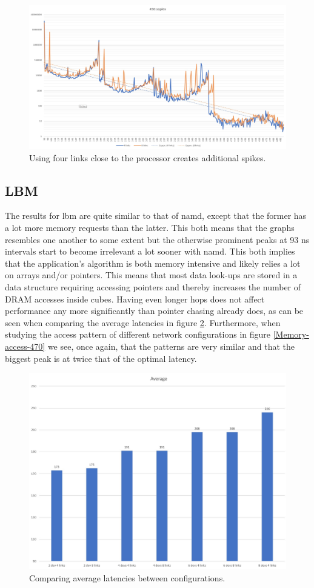 \begin{figure}[!ht]
    \centering
    \includegraphics[width=0.75\linewidth]{figure/450-2_4-8.jpg}
    \caption{Using four links close to the processor creates additional spikes.}
    \label{Memory-access-450-2-dev-4-8-links}
\end{figure}

\subsection{LBM}
The results for lbm are quite similar to that of namd, except that the former has a lot more memory requests than the latter. This both means that the graphs resembles one another to some extent but the otherwise prominent peaks at 93 ns intervals start to become irrelevant a lot sooner with namd. This both implies that the application's algorithm is both memory intensive and likely relies a lot on arrays and/or pointers. This means that most data look-ups are stored in a data structure requiring accessing pointers and thereby increases the number of DRAM accesses inside cubes. Having even longer hops does not affect performance any more significantly than pointer chasing already does, as can be seen when comparing the average latencies in figure \ref{Memory-access-470-averages}. Furthermore, when studying the access pattern of different network configurations in figure \ref{Memory-access-470} we see, once again, that the patterns are very similar and that the biggest peak is at twice that of the optimal latency.
\bigskip

\begin{figure}[!ht]
    \centering
    \includegraphics[width=0.75\linewidth]{figure/470-averages.jpg}
    \caption{Comparing average latencies between configurations.}
    \label{Memory-access-470-averages}
\end{figure}

